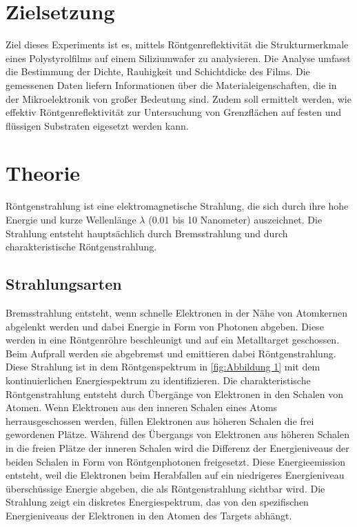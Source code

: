 \section{Zielsetzung}
\label{sec:Zielsetzung}
Ziel dieses Experiments ist es, mittels Röntgenreflektivität die Strukturmerkmale
eines Polystyrolfilms auf einem Siliziumwafer zu analysieren. Die Analyse umfasst die 
Bestimmung der Dichte, Rauhigkeit und Schichtdicke des Films. Die gemessenen Daten liefern
Informationen über die Materialeigenschaften, die in der Mikroelektronik von großer Bedeutung sind.
Zudem soll ermittelt werden, wie effektiv Röntgenreflektivität zur Untersuchung von Grenzflächen auf festen 
und flüssigen Substraten eigesetzt werden kann.


\section{Theorie}
\label{sec:Theorie}
Röntgenstrahlung ist eine elektromagnetische Strahlung, die sich durch ihre hohe Energie und kurze 
Wellenlänge \(\lambda\) (0.01 bis 10 Nanometer) auszeichnet. Die Strahlung entsteht hauptsächlich durch 
Bremsstrahlung und durch charakteristische Röntgenstrahlung.

\subsection{Strahlungsarten}
Bremsstrahlung entsteht, wenn schnelle Elektronen in der Nähe von Atomkernen abgelenkt werden und dabei Energie
in Form von Photonen abgeben. Diese werden in eine Röntgenröhre beschleunigt und auf ein Metalltarget geschossen.
Beim Aufprall werden sie abgebremst und emittieren dabei Röntgenstrahlung. Diese Strahlung ist in dem Röntgenspektrum in
\ref{fig:Abbildung 1} mit dem kontinuierlichen Energiespektrum zu identifizieren.
Die charakteristische Röntgenstrahlung entsteht durch Übergänge von Elektronen in den Schalen von Atomen. Wenn Elektronen 
aus den inneren Schalen eines Atoms herrausgeschossen werden, füllen Elektronen aus höheren Schalen die frei gewordenen Plätze.
Während des Übergangs von Elektronen aus höheren Schalen in die freien Plätze der inneren Schalen wird die Differenz der
Energieniveaus der beiden Schalen in Form von Röntgenphotonen freigesetzt. Diese Energieemission entsteht, weil die Elektronen
beim Herabfallen auf ein niedrigeres Energieniveau überschüssige Energie abgeben, die als Röntgenstrahlung sichtbar wird. Die Strahlung 
zeigt ein diskretes Energiespektrum, das von den spezifischen Energieniveaus der Elektronen in den Atomen des Targets abhängt.


